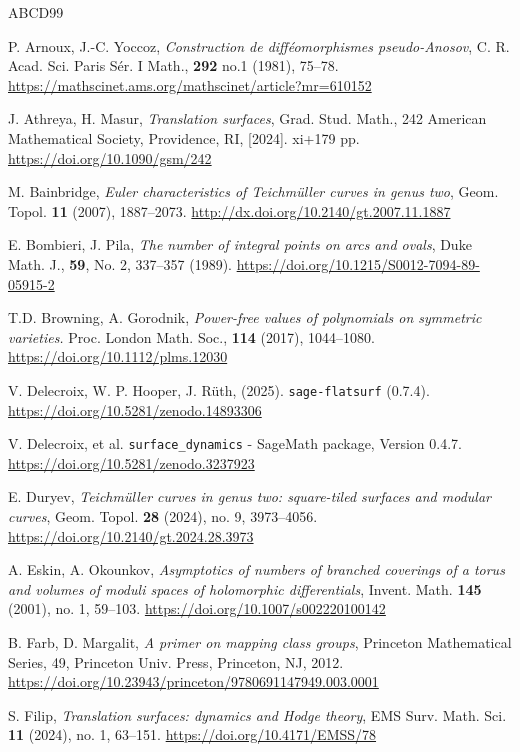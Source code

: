 \documentclass[a4paper,11pt]{amsart}
\numberwithin{equation}{section}
\numberwithin{figure}{section}
\numberwithin{table}{section}
\begin{document}
\begin{thebibliography}{ABCD99}

 P. Arnoux, J.-C. Yoccoz, {\em Construction de diff\'eomorphismes pseudo-Anosov}, C. R. Acad. Sci. Paris S\'er. I Math., \textbf{292} no.1 (1981), 75--78. \url{https://mathscinet.ams.org/mathscinet/article?mr=610152}

 J. Athreya, H. Masur, {\em Translation surfaces}, Grad. Stud. Math., 242 American Mathematical Society, Providence, RI, [2024]. xi+179 pp. \url{https://doi.org/10.1090/gsm/242}

 M. Bainbridge, {\em Euler characteristics of Teichm\"uller curves in genus two}, Geom. Topol. {\bf 11} (2007), 1887--2073. \url{http://dx.doi.org/10.2140/gt.2007.11.1887}

 E. Bombieri, J. Pila, {\em The number of integral points on arcs and ovals}, Duke Math. J., \textbf{59}, No. 2, 337--357 (1989). \url{https://doi.org/10.1215/S0012-7094-89-05915-2}

 T.D. Browning, A. Gorodnik, {\em Power-free values of polynomials on symmetric varieties.} Proc. London Math. Soc., \textbf{114} (2017), 1044--1080. \url{https://doi.org/10.1112/plms.12030}

 V. Delecroix, W. P. Hooper,  J. R\"uth, (2025). {\tt sage-flatsurf} (0.7.4). \url{https://doi.org/10.5281/zenodo.14893306}

 V. Delecroix, et al. {\tt surface\_dynamics} - SageMath package, Version 0.4.7. \url{https://doi.org/10.5281/zenodo.3237923}

 E. Duryev, {\em Teichm\"uller curves in genus two: square-tiled surfaces and modular curves}, Geom. Topol. \textbf{28} (2024), no. 9, 3973--4056. \url{https://doi.org/10.2140/gt.2024.28.3973}

 A. Eskin, A. Okounkov, {\em Asymptotics of numbers of branched coverings of a torus and volumes of moduli spaces of holomorphic differentials}, Invent. Math. \textbf{145} (2001), no. 1, 59--103. \url{https://doi.org/10.1007/s002220100142}

 B. Farb, D. Margalit, {\em A primer on mapping class groups}, Princeton Mathematical Series, 49, Princeton Univ. Press, Princeton, NJ, 2012. \url{https://doi.org/10.23943/princeton/9780691147949.003.0001}

 S. Filip, {\em Translation surfaces: dynamics and Hodge theory}, EMS Surv. Math. Sci. \textbf{11} (2024), no. 1, 63--151. \url{https://doi.org/10.4171/EMSS/78}


\end{thebibliography}
\end{document}
